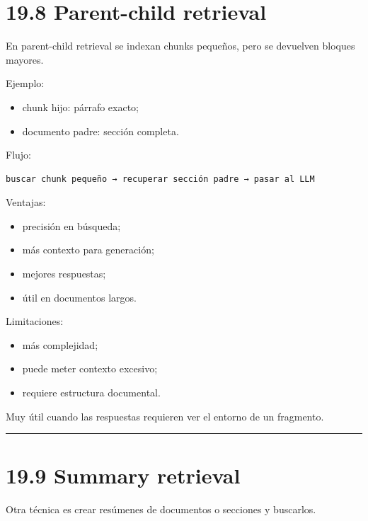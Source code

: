\section{19.8 Parent-child retrieval}\label{parent-child-retrieval}

En parent-child retrieval se indexan chunks pequeños, pero se devuelven
bloques mayores.

Ejemplo:

\begin{itemize}
\tightlist
\item
  chunk hijo: párrafo exacto;
\item
  documento padre: sección completa.
\end{itemize}

Flujo:

\begin{lstlisting}
buscar chunk pequeño → recuperar sección padre → pasar al LLM
\end{lstlisting}

Ventajas:

\begin{itemize}
\tightlist
\item
  precisión en búsqueda;
\item
  más contexto para generación;
\item
  mejores respuestas;
\item
  útil en documentos largos.
\end{itemize}

Limitaciones:

\begin{itemize}
\tightlist
\item
  más complejidad;
\item
  puede meter contexto excesivo;
\item
  requiere estructura documental.
\end{itemize}

Muy útil cuando las respuestas requieren ver el entorno de un fragmento.

\begin{center}\rule{0.5\linewidth}{0.5pt}\end{center}

\section{19.9 Summary retrieval}\label{summary-retrieval}

Otra técnica es crear resúmenes de documentos o secciones y buscarlos.

